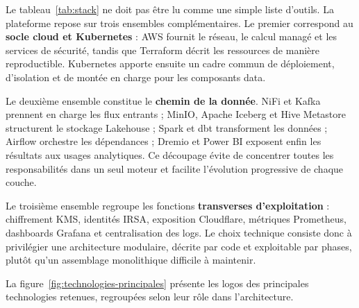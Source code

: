 Le tableau~\ref{tab:stack} ne doit pas être lu comme une simple liste d'outils. La plateforme repose sur trois ensembles complémentaires. Le premier correspond au \textbf{socle cloud et Kubernetes} : AWS fournit le réseau, le calcul managé et les services de sécurité, tandis que Terraform décrit les ressources de manière reproductible. Kubernetes apporte ensuite un cadre commun de déploiement, d'isolation et de montée en charge pour les composants data.

Le deuxième ensemble constitue le \textbf{chemin de la donnée}. NiFi et Kafka prennent en charge les flux entrants ; MinIO, Apache Iceberg et Hive Metastore structurent le stockage Lakehouse ; Spark et dbt transforment les données ; Airflow orchestre les dépendances ; Dremio et Power BI exposent enfin les résultats aux usages analytiques. Ce découpage évite de concentrer toutes les responsabilités dans un seul moteur et facilite l'évolution progressive de chaque couche.

Le troisième ensemble regroupe les fonctions \textbf{transverses d'exploitation} : chiffrement KMS, identités IRSA, exposition Cloudflare, métriques Prometheus, dashboards Grafana et centralisation des logs. Le choix technique consiste donc à privilégier une architecture modulaire, décrite par code et exploitable par phases, plutôt qu'un assemblage monolithique difficile à maintenir.

La figure~\ref{fig:technologies-principales} présente les logos des principales technologies retenues, regroupées selon leur rôle dans l'architecture.

